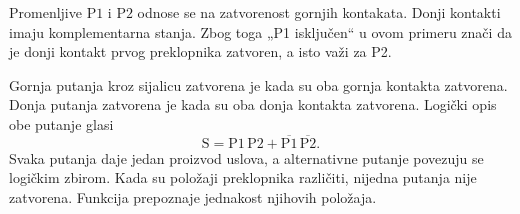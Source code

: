 
Promenljive \(\mathrm{P1}\) i \(\mathrm{P2}\) odnose se na zatvorenost gornjih kontakata. Donji kontakti imaju komplementarna stanja. Zbog toga „P1 isključen“ u ovom primeru znači da je donji kontakt prvog preklopnika zatvoren, a isto važi za P2.

Gornja putanja kroz sijalicu zatvorena je kada su oba gornja kontakta zatvorena. Donja putanja zatvorena je kada su oba donja kontakta zatvorena. Logički opis obe putanje glasi
\[
\mathrm{S}=\mathrm{P1}\,\mathrm{P2}
  +\overline{\mathrm{P1}}\,\overline{\mathrm{P2}}.
\]
Svaka putanja daje jedan proizvod uslova, a alternativne putanje povezuju se logičkim zbirom. Kada su položaji preklopnika različiti, nijedna putanja nije zatvorena. Funkcija prepoznaje jednakost njihovih položaja.
